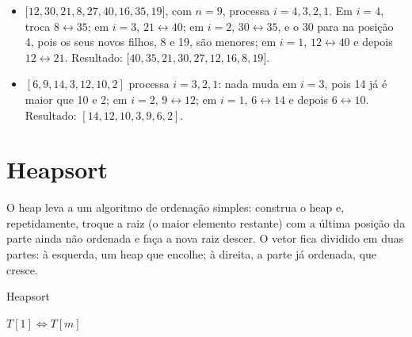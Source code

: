 \begin{exemplo}\label{ex:construcoes}\leavevmode
\begin{itemize}
  \item $[12,30,21,8,$\allowbreak$27,40,16,35,19]$, com $n=9$, processa $i=4,3,2,1$. Em $i=4$, troca $8\leftrightarrow35$; em $i=3$, $21\leftrightarrow40$; em $i=2$, $30\leftrightarrow35$, e o 30 para na posição 4, pois os seus novos filhos, 8 e 19, são menores; em $i=1$, $12\leftrightarrow40$ e depois $12\leftrightarrow21$. Resultado: $[40,35,21,30,$\allowbreak$27,12,16,8,19]$.
  \item $[6,9,14,3,12,10,2]$ processa $i=3,2,1$: nada muda em $i=3$, pois 14 já é maior que 10 e 2; em $i=2$, $9\leftrightarrow12$; em $i=1$, $6\leftrightarrow14$ e depois $6\leftrightarrow10$. Resultado: $[14,12,10,3,9,6,2]$.
\end{itemize}
\end{exemplo}

\section{Heapsort}\label{sec:heapsort}
O heap leva a um algoritmo de ordenação simples: construa o heap e, repetidamente, troque a raiz (o maior elemento restante) com a última posição da parte ainda não ordenada e faça a nova raiz descer. O vetor fica dividido em duas partes: à esquerda, um heap que encolhe; à direita, a parte já ordenada, que cresce.
\begin{pseudo}{Heapsort}
\begin{algorithmic}
  \State {} 
    \State $T[1]\Leftrightarrow T[m]$ 
    \State {} 
  \EndFor
\EndProcedure
\end{algorithmic}
\end{pseudo}

